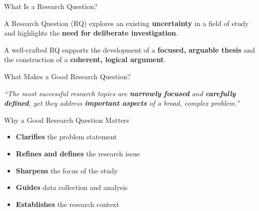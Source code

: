 \begin{frame}{What Is a Research Question?}
  \justifying
  \begin{block}{}
    \onslide<+-> A \alert{Research Question (RQ)} explores an existing \textbf{uncertainty} in a field of study
    and highlights the \textbf{need for deliberate investigation}.
    \onslide<+->

    \vspace{1cm}

    A well-crafted RQ supports the development of a \textbf{focused, arguable thesis}
    and the construction of a \textbf{coherent, logical argument}.
  \end{block}
\end{frame}

\begin{frame}{What Makes a Good Research Question?}
  \begin{block}{}
    \Large
    \centering
    \textit{“The most successful research topics are \textbf{narrowly focused} and \textbf{carefully defined}, yet they address \textbf{important aspects} of a broad, complex problem.”}
  \end{block}
\end{frame}

\begin{frame}{Why a Good Research Question Matters}
  \begin{block}{}
    \begin{itemize}
      \onslide<+-> \item \textbf{Clarifies} the problem statement
      \onslide<+-> \item \textbf{Refines and defines} the research issue
      \onslide<+-> \item \textbf{Sharpens} the focus of the study
      \onslide<+-> \item \textbf{Guides} data collection and analysis
      \onslide<+-> \item \textbf{Establishes} the research context
  \end{itemize}
\end{block}
\end{frame}
